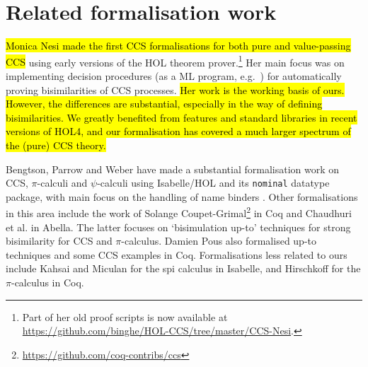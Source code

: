 \section{Related formalisation work}
\label{s:rel}

\hl{Monica Nesi made the first CCS formalisations for both pure and
value-passing CCS} \cite{Nesi:1992ve,Nesi:2017wo} using early versions of the HOL
theorem prover.\footnote{Part of her old proof scripts is now available at
  \url{https://github.com/binghe/HOL-CCS/tree/master/CCS-Nesi}.}
Her main focus was on implementing decision procedures (as a ML
program, e.g.~\cite{cleaveland1993concurrency}) for
automatically proving bisimilarities of CCS
processes. %
\hl{Her work is
  the working basis of ours. However, the differences are substantial, especially in the way of defining
bisimilarities. We greatly benefited from features and standard
libraries in recent versions of HOL4, and our formalisation has
covered a much larger spectrum of the (pure) CCS theory.}

Bengtson,  Parrow and Weber
have made a substantial formalisation work 
on CCS, $\pi$-calculi
and $\psi$-calculi 
using Isabelle/HOL and its \texttt{nominal} datatype package, with main focus on the handling of
name binders \cite{bengtson2010formalising,bengtson2007completeness,parrow2009formalising}.
%
Other formalisations in this area include the work of Solange
Coupet-Grimal\footnote{\url{https://github.com/coq-contribs/ccs}} in Coq
and Chaudhuri et al.\;\cite{chaudhuri2015lightweight} in Abella. The
latter focuses on `bisimulation up-to' techniques for strong bisimilarity 
for CCS and $\pi$-calculus.
Damien Pous also formalised up-to techniques and some CCS examples in
Coq. \cite{pous2007new}
Formalisations less related to ours
include Kahsai and Miculan \cite{kahsai2008implementing} for the spi
calculus  in Isabelle, and Hirschkoff \cite{hirschkoff1997full} for the $\pi$-calculus in Coq.
